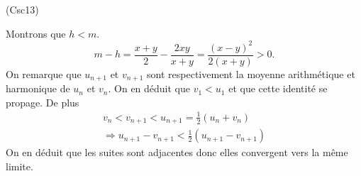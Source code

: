 \begin{tiny}(Csc13)\end{tiny} Montrons que $h < m$.
\[
 m - h 
 = \frac{x + y}{2} - \frac{2xy}{x + y}
 = \frac{(x-y)^2}{2(x+y)} > 0.
\]
On remarque que $u_{n+1}$ et $v_{n+1}$ sont respectivement la moyenne arithmétique et harmonique de $u_n$ et $v_n$. 
On en déduit que $v_1 < u_1$ et que cette identité se propage. De plus 
\begin{multline*}
v_n < v_{n+1} < u_{n+1} = \frac{1}{2}(u_n + v_n) \\
\Rightarrow  u_{n+1} - v_{n+1} < \frac{1}{2}\left( u_{n+1} - v_{n+1}\right) 
\end{multline*}
On en déduit que les suites sont adjacentes donc elles convergent vers la même limite.
